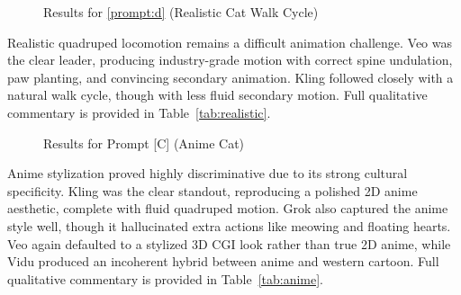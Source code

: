 \documentclass[sigconf]{acmart}
\begin{document}
\begin{figure}[H]
    \centering
    \caption{Results for \ref{prompt:d} (Realistic Cat Walk Cycle)}
    \label{fig:eval_prompt_6}
\end{figure}

\noindent Realistic quadruped locomotion remains a difficult animation challenge. Veo was the clear leader, producing industry-grade motion with correct spine undulation, paw planting, and convincing secondary animation. Kling followed closely with a natural walk cycle, though with less fluid secondary motion. Full qualitative commentary is provided in Table~\ref{tab:realistic}.



\begin{figure}[H]
    \centering
    \caption{Results for Prompt [C] (Anime Cat)}
    \label{fig:eval_prompt_7}
\end{figure}

\noindent Anime stylization proved highly discriminative due to its strong cultural specificity. Kling was the clear standout, reproducing a polished 2D anime aesthetic, complete with fluid quadruped motion. Grok also captured the anime style well, though it hallucinated extra actions like meowing and floating hearts. Veo again defaulted to a stylized 3D CGI look rather than true 2D anime, while Vidu produced an incoherent hybrid between anime and western cartoon. Full qualitative commentary is provided in Table~\ref{tab:anime}.
\end{document}
